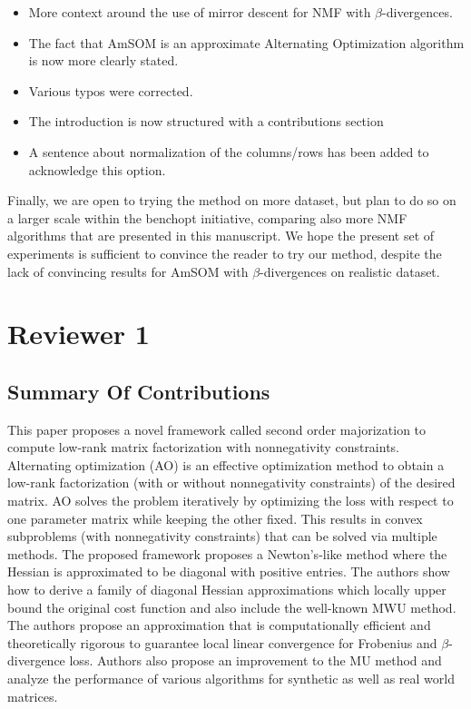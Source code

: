 \documentclass[10pt]{article} %
\begin{document}
{\begin{itemize}
    \item More context around the use of mirror descent for NMF with $\beta$-divergences.
    \item The fact that AmSOM is an approximate Alternating Optimization algorithm is now more clearly stated.
    \item Various typos were corrected.
    \item The introduction is now structured with a contributions section
    \item A sentence about normalization of the columns/rows has been added to acknowledge this option.
\end{itemize}

Finally, we are open to trying the method on more dataset, but plan to do so on a larger scale within the benchopt initiative, comparing also more NMF algorithms that are presented in this manuscript. We hope the present set of experiments is sufficient to convince the reader to try our method, despite the lack of convincing results for AmSOM with $\beta$-divergences on realistic dataset.
}

\section{Reviewer 1}

\subsection{Summary Of Contributions}

This paper proposes a novel framework called second order majorization to compute low-rank matrix factorization with nonnegativity constraints. Alternating optimization (AO) is an effective optimization method to obtain a low-rank factorization (with or without nonnegativity constraints) of the desired matrix. AO solves the problem iteratively by optimizing the loss with respect to one parameter matrix while keeping the other fixed. This results in convex subproblems (with nonnegativity constraints) that can be solved via multiple methods. The proposed framework proposes a Newton's-like method where the Hessian is approximated to be diagonal with positive entries. The authors show how to derive a family of diagonal Hessian approximations which locally upper bound the original cost function and also include the well-known MWU method. The authors propose an approximation that is computationally efficient and theoretically rigorous to guarantee local linear convergence for Frobenius and
$\beta$-divergence loss. Authors also propose an improvement to the MU method and analyze the performance of various algorithms for synthetic as well as real world matrices.
\end{document}
